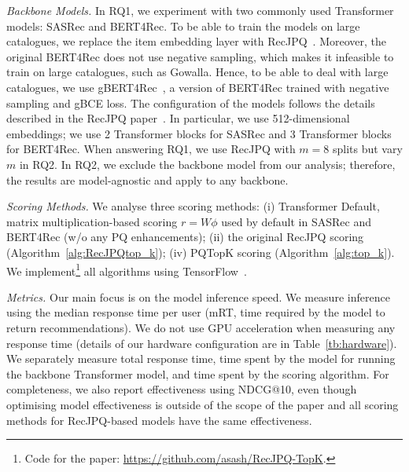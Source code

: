 \documentclass[sigconf,natbib=true, review=False]{acmart} %
\newcommand{\pageenlarge}[1]{\marginnote{#1}\enlargethispage{#1\baselineskip}}
\newcommand{\rsasha}[1]{\textcolor[HTML]{000000}{#1}}
\newcommand{\scr}[1]{\textcolor[HTML]{000000}{#1}}
\newcommand{\scrc}[1]{\textcolor[HTML]{000000}{#1}}
\begin{document}
 \textit{Backbone Models.} \scr{In RQ1, } we experiment with two commonly used Transformer models: SASRec and BERT4Rec. To be able to train the models on large catalogues, we replace the item embedding layer with RecJPQ~\cite{petrovRecJPQTrainingLargeCatalogue2024}. Moreover, the original BERT4Rec does not use negative sampling, which makes it infeasible to train on large catalogues, such as Gowalla. Hence, to be able to deal with large catalogues, we use gBERT4Rec~\cite{petrovGSASRecReducingOverconfidence2023}, a version of BERT4Rec trained with negative sampling and gBCE loss. The configuration of the models follows the details described in the RecJPQ paper~\cite{petrovRecJPQTrainingLargeCatalogue2024}. In particular, we use 512-dimensional embeddings;  we use 2 Transformer blocks for SASRec and 3 Transformer blocks for BERT4Rec. When answering RQ1, we use RecJPQ with $m=8$ splits but vary $m$ in RQ2. \scr{\scrc{In RQ2, we exclude the backbone model from our analysis;} therefore, \scrc{the results are model-agnostic and apply to any backbone}.}

 \textit{Scoring Methods.} We analyse three scoring methods: (i) Transformer Default,  matrix multiplication-based scoring $r = W\phi$ %
used by default in SASRec and BERT4Rec \rsasha{(w/o any PQ enhancements)}; (ii) the original RecJPQ \scrc{scoring} \scrc{(Algorithm~\ref{alg:RecJPQtop_k})}; (iv) PQTopK scoring (\scr{Algorithm~\ref{alg:top_k}}). We implement\footnote{\scrc{Code for the paper: \href{https://github.com/asash/RecJPQ-TopK}{https://github.com/asash/RecJPQ-TopK}}.} all algorithms using TensorFlow~\cite{abadiTensorFlowSystemLargeScale2016}. 

\textit{Metrics.} Our main focus is on the model inference speed. We measure inference using the median response time \scr{per user} (mRT, time required by the model to return recommendations). We do not use GPU acceleration when measuring any response time \rsasha{(details of our hardware configuration are in Table~\ref{tb:hardware})}. We separately measure total response time, time spent by the model for running the backbone Transformer model, and time spent by the scoring algorithm. For completeness, we also report effectiveness using NDCG@10, even though optimising model effectiveness is outside of the scope of the paper \scrc{and all scoring methods for RecJPQ-based models have the same effectiveness}. 



\end{document}
